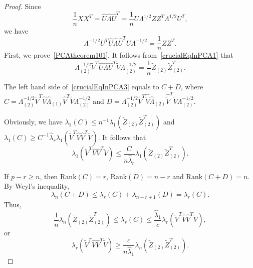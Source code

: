 \begin{proof}

    Since
    \begin{equation*}
        \frac{1}{n}XX^T=\hat{U}\hat{\Lambda}\hat{U}^T=
        \frac{1}{n}U\Lambda^{1/2}ZZ^T \Lambda^{1/2} U^T,
    \end{equation*}
    we have
    \begin{equation}\label{crucialEqInPCA1}
        \Lambda^{-1/2}U^T \hat{U}\hat{\Lambda}\hat{U}^T U\Lambda^{-1/2}=
        \frac{1}{n}ZZ^T. 
    \end{equation}
    First, we prove~\eqref{PCAtheorem101}.
    It follows from~\eqref{crucialEqInPCA1} that
    \begin{equation}\label{crucialEqInPCA3}
        \Lambda^{-1/2}_{(2)}\tilde{V}^T \hat{U}\hat{\Lambda}\hat{U}^T \tilde{V}\Lambda^{-1/2}_{(2)}=
        \frac{1}{n}\tilde{Z}_{(2)}\tilde{Z}_{(2)}^T.
    \end{equation}

    The left hand side of~\eqref{crucialEqInPCA3} equals to $C+D$, where 
    $C= \Lambda^{-1/2}_{(2)}\tilde{V}^T \hat{V}\hat{\Lambda}_{(1)}\hat{V}^T \tilde{V}\Lambda^{-1/2}_{(2)}$ 
    and 
    $D= \Lambda^{-1/2}_{(2)}\tilde{V}^T \hat{\tilde{V}}\hat{\Lambda}_{(2)}\hat{\tilde{V}}^T \tilde{V}\Lambda^{-1/2}_{(2)}$.

    Obviously, we have $\lambda_1(C)\leq {n^{-1}} \lambda_1(\tilde{Z}_{(2)} \tilde{Z}_{(2)}^T)$ and
    $
    \lambda_1(C)   \geq {C^{-1}}{\hat{\lambda}_r} \lambda_1 (\tilde{V}^T \hat{V}\hat{V}^T \tilde{V})
    $.
    It follows that 
    $$
    \lambda_1 (\tilde{V}^T \hat{V}\hat{V}^T \tilde{V})\leq 
    \frac{C}{n\hat{\lambda}_r} \lambda_1(\tilde{Z}_{(2)}\tilde{Z}_{(2)}^T).
    $$
    

    If $p-r\geq n$, then $\mathrm{Rank}(C)=r$, $\mathrm{Rank}(D)=n-r$ and $\mathrm{Rank}(C+D)=n$.
    By Weyl's inequality,
    $$\lambda_n(C+D)\leq \lambda_r(C)+ \lambda_{n-r+1}(D)=\lambda_r(C).$$
    Thus, 
    $$
 \frac{1}{n}\lambda_n(\tilde{Z}_{(2)}\tilde{Z}_{(2)}^T)   \leq \lambda_r(C)
    \leq  \frac{\hat{\lambda}_1}{c} \lambda_r(\tilde{V}^T \hat{V}\hat{V}^T \tilde{V}),
    $$
    or
    $$
      \lambda_r(\tilde{V}^T \hat{V}\hat{V}^T \tilde{V})
    \geq
    \frac{c}{n\hat{\lambda}_1}\lambda_n(\tilde{Z}_{(2)}\tilde{Z}_{(2)}^T).
    $$


\end{proof}

